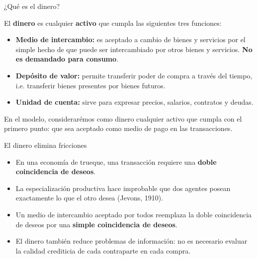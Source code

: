\documentclass[aspectratio=169,11pt]{beamer}
\newcommand{\cidehighlight}[1]{\textcolor{CIDEBlue}{\bfseries #1}}
\newcommand{\notafuentes}[1]{\note{[Sources] #1}}
\begin{document}
\begin{frame}{¿Qué es el dinero?}

  El \cidehighlight{dinero} es cualquier \cidehighlight{activo} que cumpla las siguientes tres funciones:
  \begin{itemize}
    \setlength{\itemsep}{0.65em}
    \item \textbf{Medio de intercambio:} es aceptado a cambio de bienes y servicios por el simple hecho de que puede ser intercambiado por otros bienes y servicios. \cidehighlight{No es demandado para consumo}.
    \item \textbf{Depósito de valor:} permite transferir poder de compra a través del tiempo, i.e. transferir bienes presentes por bienes futuros.
    \item \textbf{Unidad de cuenta:} sirve para expresar precios, salarios, contratos y deudas.
  \end{itemize}

  En el modelo, considerarémos como dinero cualquier activo que cumpla con el primero punto: que sea aceptado como medio de pago en las transacciones.
  \notafuentes{Williamson (2018), pp. 463--464.}
\end{frame}



\begin{frame}{El dinero elimina fricciones}
  \begin{itemize}
    \setlength{\itemsep}{0.55em}
    \item En una economía de trueque, una transacción requiere una \textbf{doble coincidencia de deseos}.
    \item La especialización productiva hace improbable que dos agentes posean exactamente lo que el otro desea (Jevons, 1910).
    \item Un medio de intercambio aceptado por todos reemplaza la doble coincidencia de deseos por una \textbf{simple coincidencia de deseos}.
    \item El dinero también reduce problemas de información: no es necesario evaluar la calidad crediticia de cada contraparte en cada compra.
  \end{itemize}
\end{frame}
\end{document}
